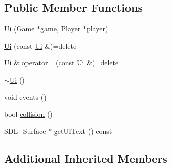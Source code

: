 \subsection*{Public Member Functions}
\begin{DoxyCompactItemize}
\item 
\hyperlink{classUi_a55c1d53a31ec024b82ce901a3ea2e4d9}{Ui} (\hyperlink{classGame}{Game} $\ast$game, \hyperlink{classPlayer}{Player} $\ast$player)
\item 
\hyperlink{classUi_aa6c7ed33d913ad19c82b6bb7e010a92f}{Ui} (const \hyperlink{classUi}{Ui} \&)=delete
\item 
\hyperlink{classUi}{Ui} \& \hyperlink{classUi_a7adc143e966ada55593ebd0607e8255d}{operator=} (const \hyperlink{classUi}{Ui} \&)=delete
\item 
\hyperlink{classUi_a7a0333fdf87c857f3b780015ee8e3bd9}{$\sim$\-Ui} ()
\item 
void \hyperlink{classUi_ac9e709710a1c0f0ad61c3347026903fc}{events} ()
\item 
bool \hyperlink{classUi_ad1dd6e7fe4739c9a7f8c4d38e52b08ce}{collision} ()
\item 
S\-D\-L\-\_\-\-Surface $\ast$ \hyperlink{classUi_a89b63a847637f8ec9d6148d7367d5857}{get\-U\-I\-Text} () const 
\end{DoxyCompactItemize}
\subsection*{Additional Inherited Members}


